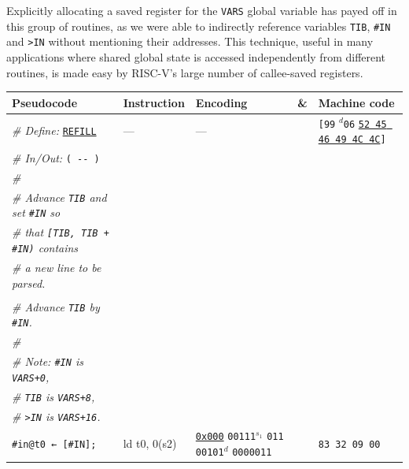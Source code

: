 \documentclass[a4paper,12pt,final]{article}
\begin{document}
Explicitly allocating a saved register for the \texttt{VARS} global variable
has payed off in this group of routines, as we were able to indirectly
reference variables \texttt{TIB}, \texttt{\#IN} and \texttt{>IN} without mentioning their
addresses.  This technique, useful in many applications where shared
global state is accessed independently from different routines, is
made easy by RISC-V's large number of callee-saved registers.

\begin{table}[!htbp] \begin{adjustwidth}{-1cm}{-1cm} \fontsize{7}{8.400000}\selectfont
\begin{center}
\begin{tabular}{l|ll|l|l}
\textbf{Pseudocode} & \textbf{Instruction} & \textbf{Encoding} & \textbf{\&} & \textbf{Machine code}\\[0pt]
\hline
\emph{\# Define:} \uline{\texttt{REFILL}} & --- & --- &  & \texttt{[99} \(^{d}\)​\texttt{06} \uline{\texttt{52 45 46 49 4C 4C}}​\texttt{]}\\[0pt]
\emph{\# In/Out:} \texttt{( -​- )} &  &  &  & \\[0pt]
\emph{\#} &  &  &  & \\[0pt]
\emph{\# Advance \texttt{TIB} and set \texttt{\#IN} so} &  &  &  & \\[0pt]
\emph{\# that \texttt{[TIB, TIB + \#IN)} contains} &  &  &  & \\[0pt]
\emph{\# a new line to be parsed.} &  &  &  & \\[0pt]
 &  &  &  & \\[0pt]
\hspace{1em} \emph{\# Advance \texttt{TIB}​ by \texttt{\#IN}.} &  &  &  & \\[0pt]
\hspace{1em} \emph{\#} &  &  &  & \\[0pt]
\hspace{1em} \emph{\# Note:         \texttt{\#IN} is \texttt{VARS+0},} &  &  &  & \\[0pt]
\hspace{1em} \emph{\# \hspace{2.35em} \texttt{TIB} is \texttt{VARS+8},} &  &  &  & \\[0pt]
\hspace{1em} \emph{\# \hspace{2.35em} \texttt{>IN} is \texttt{VARS+16}.} &  &  &  & \\[0pt]
\hspace{1em} \texttt{\#in@t0 ← [\#IN];} & ld t0, 0(s2) & \uline{\texttt{0x000}}                    \texttt{00111}​\(^{s_{1}}\) \texttt{011} \texttt{00101}​\(^{d}\)  \texttt{0000011} &  & \texttt{83 32 09 00}\\[0pt]

\end{tabular}
\end{center}
\end{adjustwidth}
\end{table}
\end{document}
